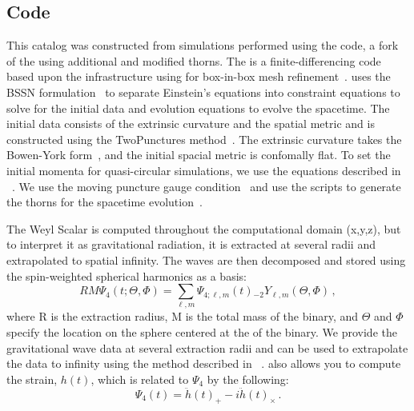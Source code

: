 \documentclass[
twocolumn,prd,
showpacs,
nofootinbib,
amsmath,amssymb,
superscriptaddress]{revtex4-1}
\begin{document}
\subsection{\maya{} Code}\label{sec:maya_code}

This catalog was constructed from simulations performed using the \maya{} code, a fork of the \etk{} using additional and modified thorns. 
The \etk{} is a finite-differencing code based upon the \cactus{} infrastructure using \carpet{} for box-in-box mesh refinement~\cite{Schnetter:2003rb}.
\maya{} uses the BSSN formulation~\cite{Baumgarte:1998te} to separate Einstein's equations into constraint equations to solve for the initial data and evolution equations to evolve the spacetime.
The initial data consists of the extrinsic curvature and the spatial metric and is constructed using the TwoPunctures method~\cite{Ansorg:2004ds}.
The extrinsic curvature takes the Bowen-York form~\cite{PhysRevD.21.2047}, and the initial spacial metric is confomally flat. 
To set the initial momenta for quasi-circular simulations, we use the \pn{} equations described in ~\cite{Healy:2017zqj}.
We use the moving puncture gauge condition~\cite{Campanelli:2005dd,Baker:2005vv} and use the \kranc{} scripts to generate the thorns for the spacetime evolution~\cite{Husa:2004ip}.

The Weyl Scalar is computed throughout the computational domain (x,y,z), but to interpret it as gravitational radiation, it is  extracted at several radii and extrapolated to spatial infinity.  
The waves  are then decomposed and stored using the spin-weighted spherical harmonics as a basis:
\begin{equation}
RM\Psi_4(t;\Theta, \Phi) = \sum_{\ell, m}\Psi_{4; \ell, m}(t) {}_{-2}Y_{\ell, m}(\Theta, \Phi) \, ,
\end{equation}
where R is the extraction radius, M is the total mass of the binary, and $\Theta$ and $\Phi$ specify the location on the sphere centered at the \com{} of the binary.
We provide the gravitational wave data at several extraction radii and \mayawaves{} can be used to extrapolate the data to infinity using the method described in ~\cite{Lousto:2010qx, Nakano:2011pb}.
\mayawaves{} also allows you to compute the strain, $h(t)$, which is related to $\Psi_4$ by the following:
\begin{equation}
\Psi_4(t) = \ddot{h}(t)_{+} - i \ddot{h}(t)_{\times} \, .
\end{equation}
\end{document}

